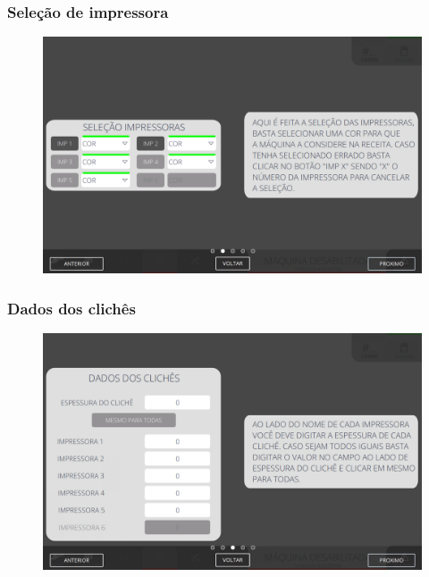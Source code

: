 \newpage
\thispagestyle{fancy}
\vspace*{40 pt}
\subsubsection{\small{Seleção de impressora}} \label{sec:telaNovoPedidoP1SelecaoImpressora}
\vspace*{\fill}
\begin{figure}[h]
    \centering
    \includegraphics[width=576 px,height=360 px]{src/imagesICV/09-request/new/e-2.png}
\end{figure}
\vspace*{\fill}

\newpage
\thispagestyle{fancy}
\vspace*{40 pt}
\subsubsection{\small{Dados dos clichês}} \label{sec:telaNovoPedidoP1DadosCliche}
\vspace*{\fill}
\begin{figure}[h]
    \centering
    \includegraphics[width=576 px,height=360 px]{src/imagesICV/09-request/new/e-3.png}
\end{figure}
\vspace*{\fill}

